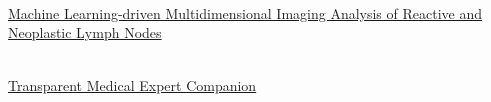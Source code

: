    {
        \\
        \href{https://www.hhi.fraunhofer.de/en/departments/ai/projects/patho234.html}{
                     Machine Learning-driven Multidimensional Imaging Analysis
                    of Reactive  and Neoplastic Lymph Nodes}
    }

    {
        \\
        \href{https://www.hhi.fraunhofer.de/en/departments/ai/projects/trameexco.html}{Transparent Medical Expert Companion}
    }


\fi
